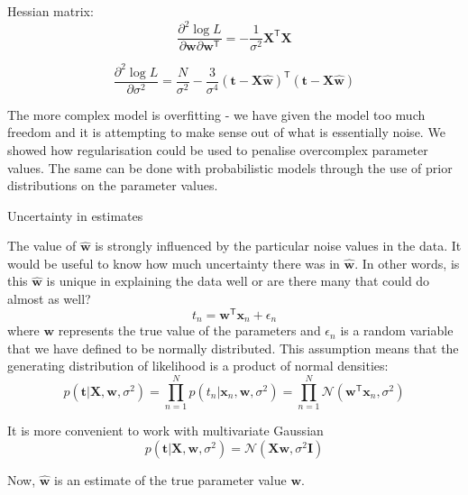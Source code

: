 \documentclass[a4paper,11pt]{article} %
\begin{document}
Hessian matrix:
\begin{equation}
\frac{\partial^2 \log L}{\partial\mathbf{w}\partial\mathbf{w}^{\mathsf{T}}} =
-\frac{1}{\sigma^2}\mathbf{X}^{\mathsf{T}}\mathbf{X}
\end{equation}

\begin{equation}
\frac{\partial^2\log L}{\partial \sigma^2} = \frac{N}{\sigma^2} -
\frac{3}{\sigma^4}(\mathbf{t} - \mathbf{X}\hat{\mathbf{w}})^{\mathsf{T}}
(\mathbf{t} - \mathbf{X}\hat{\mathbf{w}})
\end{equation}

The more complex model is overfitting - we have given the model too
much freedom and it is attempting to make sense out of what is essentially noise.
We showed how regularisation could be used to penalise overcomplex
parameter values. The same can be done with probabilistic models through the use
of prior distributions on the parameter values.

Uncertainty in estimates

The value of $\hat{\mathbf{w}}$ is strongly influenced by the particular noise values in the data.
It would be useful to know how much uncertainty there was in $\hat{\mathbf{w}}$.
In other words, is this $\hat{\mathbf{w}}$ is unique in explaining the data well or are there
many that could do almost as well?
\begin{equation}
t_{n} = \mathbf{w}^{\mathsf{T}}\mathbf{x}_{n} + \epsilon_{n}
\end{equation}
where $\mathbf{w}$ represents the true value of the parameters and $\epsilon_n$ is a random
variable that we have defined to be normally distributed. This assumption means that the
generating distribution of likelihood is a product of normal densities:
\begin{equation}
p(\mathbf{t}|\mathbf{X},\mathbf{w},\sigma^2) =
\prod_{n=1}^{N} p(t_{n} | \mathbf{x}_{n},\mathbf{w},\sigma^2) =
\prod_{n=1}^{N} \mathcal{N}(\mathbf{w}^{\mathsf{T}}\mathbf{x}_{n},\sigma^2)
\end{equation}

It is more convenient to work with multivariate Gaussian
\begin{equation}
p(\mathbf{t}|\mathbf{X},\mathbf{w},\sigma^2) = \mathcal{N}(\mathbf{X}\mathbf{w},\sigma^2\mathbf{I})
\end{equation}

Now, $\hat{\mathbf{w}}$ is an estimate of the true parameter value $\mathbf{w}$.
\end{document}
